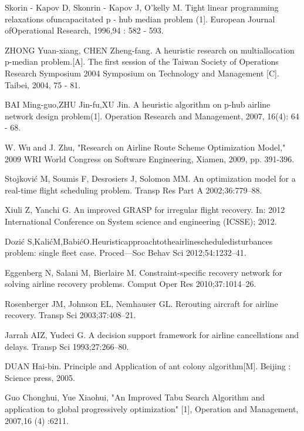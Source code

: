 \documentclass[runningheads]{llncs}
\begin{document}
\begin{thebibliography}{8}
Skorin - Kapov D, Skonrin - Kapov J, O'kelly M. Tight linear programming relaxations ofuncapacitated p - hub median problem (1]. European Journal ofOperational Research, 1996,94 : 582 - 593.

ZHONG Yuan-xiang, CHEN Zheng-fang. A heuristic research on multiallocation p-median problem.[A]. The first session of the Taiwan Society of Operations Research Symposium 2004 Symposium on Technology and Management [C]. Taibei, 2004, 75 - 81.

BAI Ming-guo,ZHU Jin-fu,XU Jin. A heuristic algorithm on p-hub airline network design problem(1]. Operation Research and Management, 2007, 16(4): 64 - 68. 

W. Wu and J. Zhu, "Research on Airline Route Scheme Optimization Model," 2009 WRI World Congress on Software Engineering, Xiamen, 2009, pp. 391-396.

Stojković M, Soumis F, Desrosiers J, Solomon MM. An optimization model for a real-time ﬂight scheduling problem. Transp Res Part A 2002;36:779–88. 

Xiuli Z, Yanchi G. An improved GRASP for irregular ﬂight recovery. In: 2012 International Conference on System science and engineering (ICSSE); 2012. 

Dozić S,KalićM,BabićO.Heuristicapproachtotheairlinescheduledisturbances problem: single ﬂeet case. Proced—Soc Behav Sci 2012;54:1232–41. 

Eggenberg N, Salani M, Bierlaire M. Constraint-speciﬁc recovery network for solving airline recovery problems. Comput Oper Res 2010;37:1014–26. 

Rosenberger JM, Johnson EL, Nemhauser GL. Rerouting aircraft for airline recovery. Transp Sci 2003;37:408–21.

Jarrah AIZ, Yudeci G. A decision support framework for airline cancellations and delays. Transp Sci 1993;27:266–80. 

DUAN Hai-bin. Principle and Application of ant colony algorithm[M]. Beijing : Science press, 2005.

Guo Chonghui, Yue Xiaohui, "An Improved Tabu Search Algorithm and application to global progressively optimization" [1], Operation and Management, 2007,16 (4) :6211.





\end{thebibliography}
\end{document}
